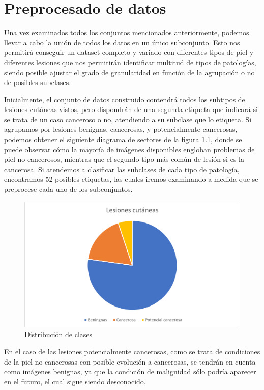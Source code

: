 \chapter{Preprocesado de datos}


Una vez examinados todos los conjuntos mencionados anteriormente, podemos llevar a cabo la unión de todos los datos en un único subconjunto. Esto nos permitirá conseguir un dataset completo y variado con diferentes tipos de piel y diferentes lesiones que nos permitirán identificar multitud de tipos de patologías, siendo posible ajustar el grado de granularidad en función de la agrupación o no de posibles subclases.

Inicialmente, el conjunto de datos construido contendrá todos los subtipos de lesiones cutáneas vistos, pero dispondrán de una segunda etiqueta que indicará si se trata de un caso canceroso o no, atendiendo a su subclase que lo etiqueta. Si agrupamos por lesiones benignas, cancerosas, y potencialmente cancerosas, podemos obtener el siguiente diagrama de sectores de la figura \ref{tartabinaria}, donde se puede observar cómo la mayoría de imágenes disponibles engloban problemas de piel no cancerosos, mientras que el segundo tipo más común de lesión si es la cancerosa. Si atendemos a clasificar las subclases de cada tipo de patología, encontramos 52 posibles etiquetas, las cuales iremos examinando a medida que se preprocese cada uno de los subconjuntos.


\begin{figure}[H]
	\centering
	\label {tartabinaria}
	\includegraphics[scale = 0.7]{imagenes/datasetfinal.png}
	\caption{Distribución de clases}
\end{figure}

En el caso de las lesiones potencialmente cancerosas, como se trata de condiciones de la piel no cancerosas con posible evolución a cancerosas, se tendrán en cuenta como imágenes benignas, ya que la condición de malignidad sólo podría aparecer en el futuro, el cual sigue siendo desconocido.

